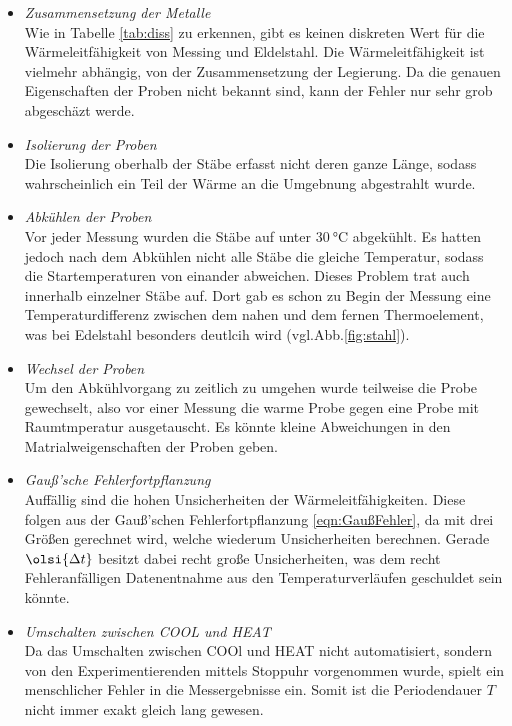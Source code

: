 \begin{itemize}
    \item \textit{Zusammensetzung der Metalle}\\
    Wie in Tabelle \ref{tab:diss} zu erkennen, gibt es keinen diskreten Wert für die Wärmeleitfähigkeit von Messing und Eldelstahl. Die 
    Wärmeleitfähigkeit ist vielmehr abhängig, von der Zusammensetzung der Legierung. Da die genauen Eigenschaften der Proben nicht bekannt
    sind, kann der Fehler nur sehr grob abgeschäzt werde.
    \item \textit{Isolierung der Proben}\\
    Die Isolierung oberhalb der Stäbe erfasst nicht deren ganze Länge, sodass wahrscheinlich ein Teil der Wärme an die Umgebnung abgestrahlt wurde.
    \item \textit{Abkühlen der Proben}\\
    Vor jeder Messung wurden die Stäbe auf unter $\SI{30}{\celsius}$ abgekühlt. Es hatten jedoch nach dem Abkühlen nicht alle Stäbe die gleiche
    Temperatur, sodass die Startemperaturen von einander abweichen. Dieses Problem trat auch innerhalb einzelner Stäbe auf. Dort gab es schon 
    zu Begin der Messung eine Temperaturdifferenz zwischen dem nahen und dem fernen Thermoelement, was bei Edelstahl besonders deutlcih wird 
    (vgl.Abb.\ref{fig:stahl}). 
    \item \textit{Wechsel der Proben}\\
    Um den Abkühlvorgang zu zeitlich zu umgehen wurde teilweise die Probe gewechselt, also vor einer Messung die warme Probe gegen eine Probe
    mit Raumtmperatur ausgetauscht. Es könnte kleine Abweichungen in den Matrialweigenschaften der Proben geben.
    \item \textit{Gauß'sche Fehlerfortpflanzung}\\
    Auffällig sind die hohen Unsicherheiten der Wärmeleitfähigkeiten. Diese folgen aus der Gauß'schen Fehlerfortpflanzung \eqref{eqn:GaußFehler}, 
    da mit drei Größen gerechnet wird, welche wiederum Unsicherheiten berechnen. Gerade $\olsi{\Delta t}$ besitzt dabei recht große Unsicherheiten,
    was dem recht Fehleranfälligen Datenentnahme aus den Temperaturverläufen geschuldet sein könnte.
    \item \textit{Umschalten zwischen COOL und HEAT}\\
    Da das Umschalten zwischen COOl und HEAT nicht automatisiert, sondern von den Experimentierenden mittels Stoppuhr vorgenommen wurde, 
    spielt ein menschlicher Fehler in die Messergebnisse ein. Somit ist die Periodendauer $T$ nicht immer exakt gleich lang gewesen.   
\end{itemize}